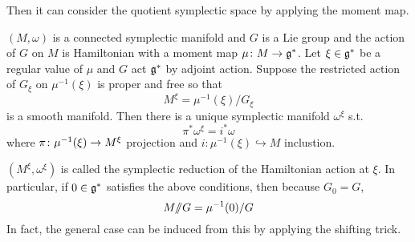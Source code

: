 \documentclass[a4paper,12pt]{article}
\begin{document}
	Then it can consider the quotient symplectic space by applying the moment map.
	\begin{thm}
		$(M,\omega)$ is a connected symplectic manifold and $G$ is a Lie group and the action of $G$ on $M$ is Hamiltonian with a moment map $\mu \colon M \rightarrow \mathfrak{g}^*$. Let $\xi  \in \mathfrak{g}^*$ be a regular value of $\mu$ and $G$ act $\mathfrak{g}^*$ by adjoint action. Suppose the restricted action of $G_{\xi}$ on $\mu^{-1}(\xi)$ is proper and free so that
		\begin{equation*}
			M^{\xi} = \mu^{-1}(\xi) / G_{\xi}
		\end{equation*}
		is a smooth manifold. Then there is a unique symplectic manifold $\omega^{\xi}$ s.t.
		\begin{equation*}
			\pi^*\omega^{\xi}  =  i^*\omega
		\end{equation*}
		where $\pi \colon \mu^{-1}(\xi) \rightarrow M^{\xi}$ projection and $i \colon \mu^{-1}(\xi) \hookrightarrow M$ inclustion.
	\end{thm}
	\begin{rem}
		$(M^{\xi},\omega^{\xi})$ is called the symplectic reduction of the Hamiltonian action at $\xi$. In particular, if $0\in \mathfrak{g}^*$ satisfies the above conditions, then because $G_0  = G$,
		\begin{equation*}
		 	M /\mskip-6mu/ G = \mu^{-1}(0) / G
		\end{equation*}
		In fact, the general case can be induced from this by applying the shifting trick.
	\end{rem}
\end{document}
